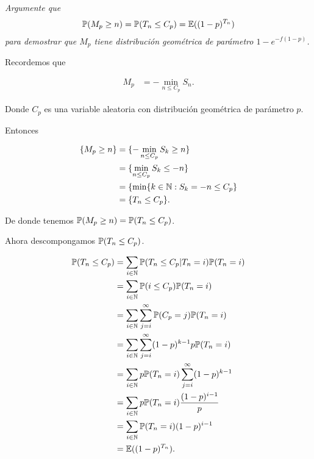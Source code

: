 \emph{
    Argumente que
    \null
    \begin{align}
        \mathbb{P}(M_p\geq n)=\mathbb{P}(T_n\leq C_p)=\mathbb{E}((1-p)^{T_n})
    \end{align}
    \null
    para demostrar que $M_p$ tiene distribuci\'on geom\'etrica de par\'ametro $1-e^{-f(1-p)}$.
}

\afterstatement\par\null

    Recordemos que
    
    \begin{align}
        M_p     &=  -\min_{n\leq C_p} S_n. 
    \end{align}\par\null
    
    Donde $C_p$ es una variable aleatoria con distribución geométrica de parámetro $p$.
    
    Entonces 
    
    \begin{align}
        \{ M_p \geq n\}     &=  \{ -\min_{n\leq C_p} S_k \geq n \}          \\
                            &=  \{ \min_{n \leq C_p} S_k \leq -n \}         \\
                            &=  \{ \min\{ k \in \mathbb{N} : S_k = -n \leq C_p \}   \\
                            &=  \{ T_n \leq C_p \}.
    \end{align}\par\null
    
    De donde tenemos $\mathbb{P}(M_p\geq n)=\mathbb{P}(T_n\leq C_p)$.\par\null
    
    Ahora descompongamos $\mathbb{P}(T_n \leq C_p)$.
    
    \begin{align}
        \mathbb{P}(T_n \leq C_p)   &=  \sum_{i \in \mathbb{N}} \mathbb{P}(T_n \leq C_p | T_n = i) \mathbb{P}(T_n = i)        \\
                            &=  \sum_{i \in \mathbb{N}} \mathbb{P}(i \leq C_p) \mathbb{P}(T_n = i)                    \\
                            &=  \sum_{i \in \mathbb{N}} \sum_{j = i}^{\infty} \mathbb{P}(C_p = j) \mathbb{P}(T_n = i) \\
                            &=  \sum_{i \in \mathbb{N}} \sum_{j = i}^{\infty} (1-p)^{k-1} p\mathbb{P}(T_n = i) \\
                            &=  \sum_{i \in \mathbb{N}} p\mathbb{P}(T_n = i) \sum_{j = i}^{\infty} (1-p)^{k-1} \\                            
                            &=  \sum_{i \in \mathbb{N}} p\mathbb{P}(T_n = i) \frac{(1-p)^{i-1}}{p}             \\                            
                            &=  \sum_{i \in \mathbb{N}} \mathbb{P}(T_n = i) (1-p)^{i-1}                        \\                     
                            &=  \mathbb{E}((1-p)^{T_n}).                                                            
    \end{align}\par\null
    
